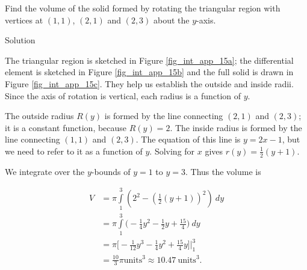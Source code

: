 \begin{example}\label{ex_wash2}
Find the volume of the solid formed by rotating the triangular region with vertices at $(1,1)$, $(2,1)$ and $(2,3)$ about the $y$-axis.

Solution 

The triangular region is sketched in Figure \ref{fig_int_app_15a}; the differential element is sketched in  Figure \ref{fig_int_app_15b} and the full solid is drawn in  Figure \ref{fig_int_app_15c}. They help us establish the outside and inside radii. Since the axis of rotation is vertical, each radius is a function of $y$. 

The outside radius $R(y)$ is formed by the line connecting $(2,1)$ and $(2,3)$; it is a constant function, because $R(y)=2$. The inside radius is formed by the line connecting $(1,1)$ and $(2,3)$. The equation of this line is $y=2x-1$, but we need to refer to it as a function of $y$. Solving for $x$ gives $r(y) = \frac12(y+1)$. 

We integrate over the $y$-bounds of $y=1$ to $y=3$. Thus the volume is

\allowdisplaybreaks
\begin{align*}
V 	&=	\pi\int\limits_1^3\left(2^2 - \left(\frac12(y+1)\right)^2\right)\ dy \\[0.2cm]
		&=	\pi\int\limits_1^3\Big(-\frac14y^2-\frac12y+\frac{15}4\Big)\ dy \\[0.2cm]
		&= 	\pi\Big[-\frac1{12}y^3-\frac14y^2+\frac{15}4y\Big]\Big|_1^3\\[0.2cm]
		&= \frac{10}3\pi\text{units}^3 \approx 10.47\ \text{units}^3.
\end{align*}




\end{example}
